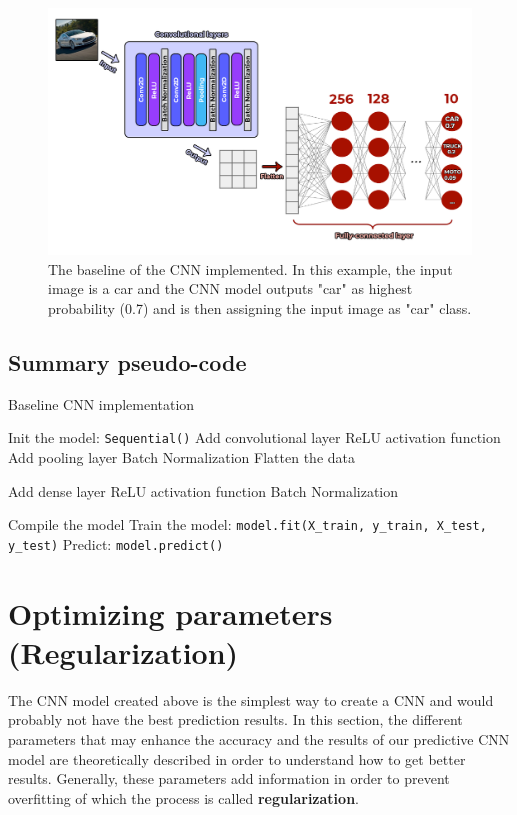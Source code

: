 \documentclass[11pt, openany]{report}
\theoremstyle{plain}
\theoremstyle{definition}
\theoremstyle{remark}
\begin{document}
\begin{figure}[h]
  \centering
  \includegraphics[scale=0.38]{figures/my-cnn.png}
  \caption{The baseline of the CNN implemented. In this example, the input image is a car and the CNN model outputs "car" as highest probability (0.7) and is then assigning the input image as "car" class.}
  \label{fig:my-CNN}
\end{figure}

\subsection{Summary pseudo-code}

\begin{algorithm}[H]
  \caption{Baseline CNN implementation} \label{alg:CNN}
  \begin{algorithmic}[1]
  \State Init the model: \texttt{Sequential()}
  \State Add convolutional layer
  \State ReLU activation function 
  \State Add pooling layer
  \EndIf
  \State Batch Normalization  
  \EndFor
  \State Flatten the data
  
  \State Add dense layer
  \State ReLU activation function
  \State Batch Normalization 
  \Else 
  \EndIf
  \EndFor
  
  \State Compile the model 
  \State Train the model: \texttt{model.fit(X\_train, y\_train, X\_test, y\_test)} 
  \State Predict: \texttt{model.predict()}
  \end{algorithmic}
\end{algorithm}

\section{Optimizing parameters (Regularization)}
The CNN model created above is the simplest way to create a CNN and would probably not have the best prediction results. In this section, the different parameters that may enhance the accuracy and the results of our predictive CNN model are theoretically described in order to understand how to get better results. Generally, these parameters add information in order to prevent overfitting of which the process is called \textbf{regularization}.  
\end{document}
